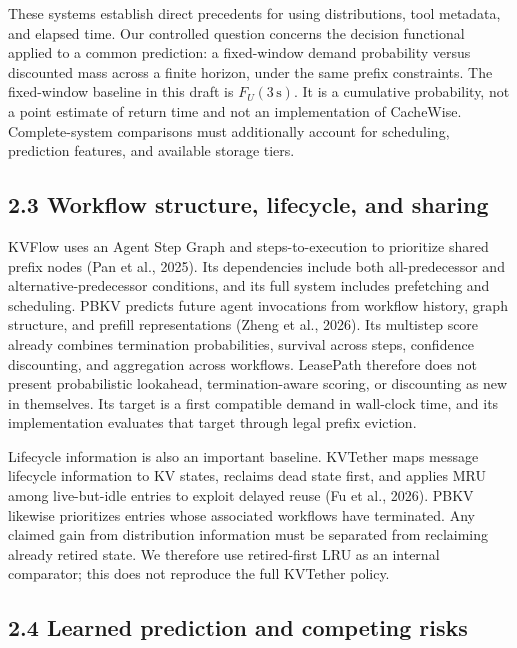 \documentclass[
  english,
  10pt,
]{article}
\begin{document}
These systems establish direct precedents for using distributions, tool
metadata, and elapsed time. Our controlled question concerns the
decision functional applied to a common prediction: a fixed-window
demand probability versus discounted mass across a finite horizon, under
the same prefix constraints. The fixed-window baseline in this draft is
\(F_U(3\,\mathrm{s})\). It is a cumulative probability, not a point
estimate of return time and not an implementation of CacheWise.
Complete-system comparisons must additionally account for scheduling,
prediction features, and available storage tiers.

\subsection{2.3 Workflow structure, lifecycle, and
sharing}\label{workflow-structure-lifecycle-and-sharing}

KVFlow uses an Agent Step Graph and steps-to-execution to prioritize
shared prefix nodes (Pan et al., 2025). Its dependencies include both
all-predecessor and alternative-predecessor conditions, and its full
system includes prefetching and scheduling. PBKV predicts future agent
invocations from workflow history, graph structure, and prefill
representations (Zheng et al., 2026). Its multistep score already
combines termination probabilities, survival across steps, confidence
discounting, and aggregation across workflows. LeasePath therefore does
not present probabilistic lookahead, termination-aware scoring, or
discounting as new in themselves. Its target is a first compatible
demand in wall-clock time, and its implementation evaluates that target
through legal prefix eviction.

Lifecycle information is also an important baseline. KVTether maps
message lifecycle information to KV states, reclaims dead state first,
and applies MRU among live-but-idle entries to exploit delayed reuse (Fu
et al., 2026). PBKV likewise prioritizes entries whose associated
workflows have terminated. Any claimed gain from distribution
information must be separated from reclaiming already retired state. We
therefore use retired-first LRU as an internal comparator; this does not
reproduce the full KVTether policy.

\subsection{2.4 Learned prediction and competing
risks}\label{learned-prediction-and-competing-risks}
\end{document}
